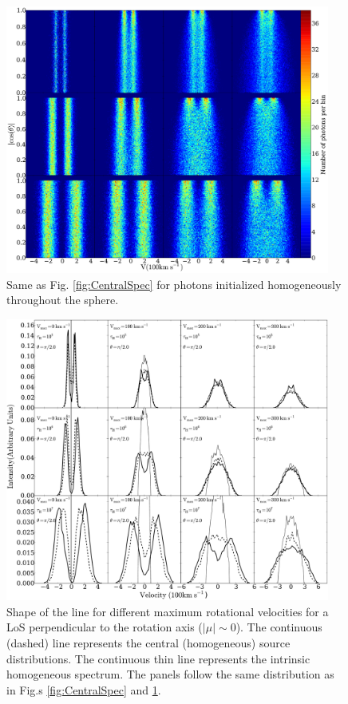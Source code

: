 \begin{figure}
\begin{center}
\includegraphics[width=0.95\textwidth]{../Figures/f3.pdf}
\end{center}
\caption{Same as Fig. \ref{fig:CentralSpec} for \ly photons
initialized homogeneously throughout the sphere.
\label{fig:HomSpec}}
\end{figure}
\begin{figure}
\begin{center}
\includegraphics[width=0.95\textwidth]{../Figures/f4.pdf}
\end{center}
\caption{Shape of the \ly line for different maximum rotational
velocities for a LoS perpendicular to the rotation axis
($|\mu|\sim 0$). The continuous (dashed) line represents the central
(homogeneous) source distributions. The continuous thin line
represents the intrinsic homogeneous spectrum. The panels follow the same
distribution as in Fig.s \ref{fig:CentralSpec} and \ref{fig:HomSpec}.
\label{fig:differentvelocities}}
\end{figure}
